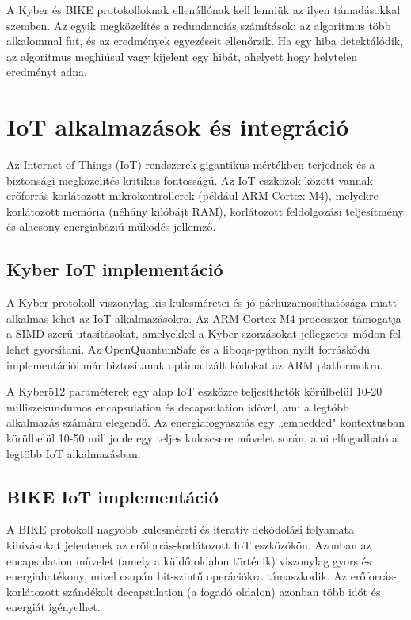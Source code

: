 A Kyber és BIKE protokolloknak ellenállónak kell lenniük az ilyen 
támadásokkal szemben. Az egyik megközelítés a redundanciás számítások: 
az algoritmus több alkalommal fut, és az eredmények egyezéseit 
ellenőrzik. Ha egy hiba detektálódik, az algoritmus meghiúsul vagy 
kijelent egy hibát, ahelyett hogy helytelen eredményt adna.


\section{IoT alkalmazások és integráció}


Az Internet of Things (IoT) rendszerek gigantikus mértékben terjednek 
és a biztonsági megközelítés kritikus fontosságú. Az IoT eszközök között 
vannak erőforrás-korlátozott mikrokontrollerek (például ARM Cortex-M4), 
melyekre korlátozott memória (néhány kilóbájt RAM), korlátozott feldolgozási 
teljesítmény és alacsony energiabáziú működés jellemző.

\subsection{Kyber IoT implementáció}

A Kyber protokoll viszonylag kis kulcsméretei és jó párhuzamosíthatósága 
miatt alkalmas lehet az IoT alkalmazásokra. Az ARM Cortex-M4 processzor 
támogatja a SIMD szerű utasításokat, amelyekkel a Kyber szorzásokat 
jellegzetes módon fel lehet gyorsítani. Az OpenQuantumSafe és a liboqs-python 
nyílt forráskódú implementációi már biztosítanak optimalizált kódokat 
az ARM platformokra.

A Kyber512 paraméterek egy alap IoT eszközre teljesíthetők körülbelül 
10-20 milliszekundumos encapsulation és decapsulation idővel, ami 
a legtöbb alkalmazás számára elegendő. Az energiafogyasztás egy 
„embedded" kontextusban körülbelül 10-50 millijoule egy teljes 
kulcscsere művelet során, ami elfogadható a legtöbb IoT alkalmazásban.

\subsection{BIKE IoT implementáció}

A BIKE protokoll nagyobb kulcsméreti és iteratív dekódolási folyamata 
 kihívásokat jelentenek az erőforrás-korlátozott IoT eszközökön. 
Azonban az encapsulation művelet (amely a küldő oldalon történik) 
viszonylag gyors és energiahatékony, mivel csupán bit-szintű operációkra 
támaszkodik. Az erőforrás-korlátozott szándékolt decapsulation 
(a fogadó oldalon) azonban több időt és energiát igényelhet.

